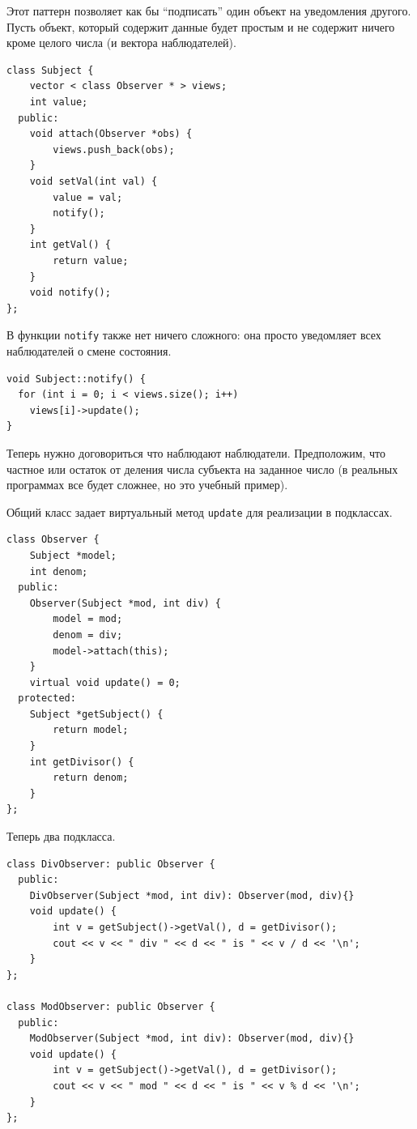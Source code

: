 \documentclass[a4paper,12pt,oneside]{article}
\begin{document}
Этот паттерн позволяет как бы ``подписать'' один объект на уведомления другого. Пусть объект, который содержит данные будет простым и не содержит ничего кроме целого числа (и вектора наблюдателей).

\begin{lstlisting}
class Subject {
    vector < class Observer * > views; 
    int value;
  public:
    void attach(Observer *obs) {
        views.push_back(obs);
    }
    void setVal(int val) {
        value = val;
        notify();
    }
    int getVal() {
        return value;
    }
    void notify();
};
\end{lstlisting}

В функции \lstinline!notify! также нет ничего сложного: она просто уведомляет всех наблюдателей о смене состояния.

\begin{lstlisting}
void Subject::notify() {
  for (int i = 0; i < views.size(); i++)
    views[i]->update();
}
\end{lstlisting}

Теперь нужно договориться что наблюдают наблюдатели. Предположим, что частное или остаток от деления числа субъекта на заданное число (в реальных программах все будет сложнее, но это учебный пример).

Общий класс задает виртуальный метод \lstinline!update! для реализации в подклассах.

\begin{lstlisting}
class Observer {
    Subject *model;
    int denom;
  public:
    Observer(Subject *mod, int div) {
        model = mod;
        denom = div;
        model->attach(this);
    }
    virtual void update() = 0;
  protected:
    Subject *getSubject() {
        return model;
    }
    int getDivisor() {
        return denom;
    }
};
\end{lstlisting}

Теперь два подкласса.

\begin{lstlisting}
class DivObserver: public Observer {
  public:
    DivObserver(Subject *mod, int div): Observer(mod, div){}
    void update() {
        int v = getSubject()->getVal(), d = getDivisor();
        cout << v << " div " << d << " is " << v / d << '\n';
    }
};

class ModObserver: public Observer {
  public:
    ModObserver(Subject *mod, int div): Observer(mod, div){}
    void update() {
        int v = getSubject()->getVal(), d = getDivisor();
        cout << v << " mod " << d << " is " << v % d << '\n';
    }
};
\end{lstlisting}
\end{document}
